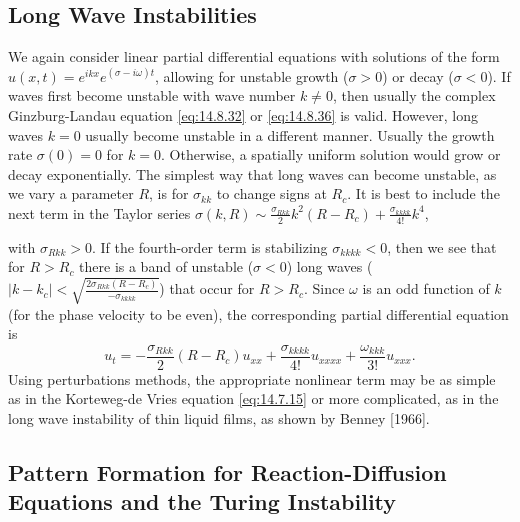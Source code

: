 \subsection{Long Wave Instabilities}
\label{subsec:14.8.7}

We again consider linear partial differential equations with solutions of the form $u(x,t) = e^{ikx}e^{(\sigma - i\omega)t}$, allowing for unstable growth ($\sigma > 0$) or decay ($\sigma < 0$). If waves first become unstable with wave number $k \neq 0$, then usually the complex Ginzburg-Landau equation \eqref{eq:14.8.32} or \eqref{eq:14.8.36} is valid. However, long waves $k = 0$ usually become unstable in a different manner. Usually the growth rate $\sigma(0) = 0$ for $k = 0$. Otherwise, a spatially uniform solution would grow or decay exponentially. The simplest way that long waves can become unstable, as we vary a parameter $R$, is for $\sigma_{kk}$ to change signs at $R_c$. It is best to include the next term in the Taylor series $\sigma(k,R) \sim \frac{\sigma_{Rkk}}{2}k^2(R - R_c) + \frac{\sigma_{kkkk}}{4!}k^4$,

with $\sigma_{Rkk} > 0$. If the fourth-order term is stabilizing $\sigma_{kkkk} < 0$, then we see that for $R > R_c$ there is a band of unstable ($\sigma < 0$) long waves ($|k - k_c| < \sqrt{\frac{2\sigma_{Rkk}(R-R_c)}{-\sigma_{kkkk}}}$) that occur for $R > R_c$. Since $\omega$ is an odd function of $k$ (for the phase velocity to be even), the corresponding partial differential equation is
\begin{equation}
u_t = -\frac{\sigma_{Rkk}}{2}(R - R_c)u_{xx} + \frac{\sigma_{kkkk}}{4!}u_{xxxx} + \frac{\omega_{kkk}}{3!}u_{xxx}.
\label{eq:14.8.53}
\end{equation}
Using perturbations methods, the appropriate nonlinear term may be as simple as in the Korteweg-de Vries equation \eqref{eq:14.7.15} or more complicated, as in the long wave instability of thin liquid films, as shown by Benney [1966].

\subsection{Pattern Formation for Reaction-Diffusion Equations and the Turing Instability}
\label{subsec:14.8.8}

